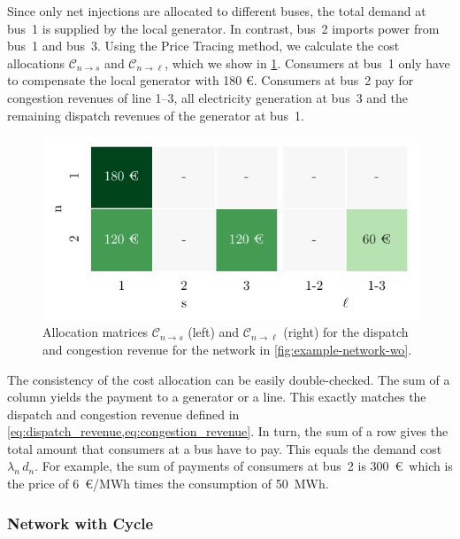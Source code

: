 \documentclass[11pt,twocolumn]{article}
\begin{document}
Since only net injections are allocated to different buses, the total demand at bus~1 is supplied by the local generator. In contrast, bus~2 imports power from bus~1 and bus~3. Using the Price Tracing method, we calculate the cost allocations $\mathcal{C}_{n\rightarrow s}$ and $\mathcal{C}_{n\rightarrow \ell}$, which we show in \cref{fig:example-network-payoff-wo}. Consumers at bus~1 only have to compensate the local generator with 180 \euro. Consumers at bus~2 pay for congestion revenues of line 1--3, all electricity generation at bus~3 and the remaining dispatch revenues of the generator at bus~1.    

\begin{figure}[h]
    \includegraphics[width=\linewidth]{example-without-cycles/payoff}
    \caption{Allocation matrices $\mathcal{C}_{n\rightarrow s}$ (left) and $\mathcal{C}_{n\rightarrow \ell}$ (right) for the dispatch and congestion revenue for the network in \cref{fig:example-network-wo}.}
    \label{fig:example-network-payoff-wo}
\end{figure}
 
The consistency of the cost allocation can be easily double-checked. The sum of a column  yields the payment to a generator or a line. This exactly matches the dispatch and congestion revenue defined in \cref{eq:dispatch_revenue,eq:congestion_revenue}. In turn, the sum of a row gives the total amount that consumers at a bus have to pay. This equals the demand cost $\lambda_n \, d_n$. For example, the sum of payments of consumers at bus~2 is 300~\euro\, which is the price of 6~\euro/MWh times the consumption of 50~MWh. \\



\subsubsection*{Network with Cycle}
\end{document}
